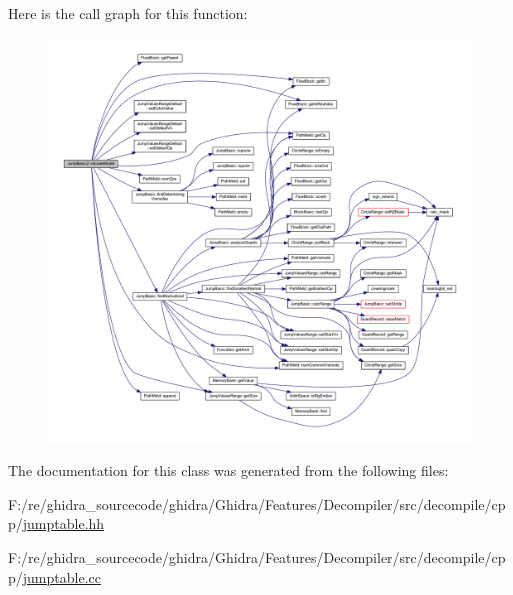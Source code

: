 Here is the call graph for this function\+:
\nopagebreak
\begin{figure}[H]
\begin{center}
\leavevmode
\includegraphics[width=350pt]{class_jump_basic2_adc60ecb0d804d1a7754161b38ae3299f_cgraph}
\end{center}
\end{figure}


The documentation for this class was generated from the following files\+:\begin{DoxyCompactItemize}
\item 
F\+:/re/ghidra\+\_\+sourcecode/ghidra/\+Ghidra/\+Features/\+Decompiler/src/decompile/cpp/\mbox{\hyperlink{jumptable_8hh}{jumptable.\+hh}}\item 
F\+:/re/ghidra\+\_\+sourcecode/ghidra/\+Ghidra/\+Features/\+Decompiler/src/decompile/cpp/\mbox{\hyperlink{jumptable_8cc}{jumptable.\+cc}}\end{DoxyCompactItemize}
